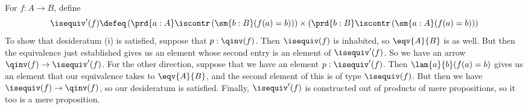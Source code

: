 For $f : A \to B$, define 
\[
  \isequiv'(f) \defeq
  \left(\prd{a:A}\iscontr\left(\sm{b:B}(f(a) = b)\right)\right)
  \times
  \left(\prd{b:B}\iscontr\left(\sm{a:A}(f(a) = b)\right)\right)
\]
To show that desideratum (i) is satisfied, suppose that $p : \qinv(f)$.  Then
$\isequiv(f)$ is inhabited, so $\eqv{A}{B}$ is as well.  But then the
equivalence just established gives us an element whose second entry is an
element of $\isequiv'(f)$.  So we have an arrow $\qinv(f) \to \isequiv'(f)$.
For the other direction, suppose that we have an element $p : \isequiv'(f)$.
Then $\lam{a}{b}(f(a) = b)$ gives us an element that our equivalence takes to
$\eqv{A}{B}$, and the second element of this is of type $\isequiv(f)$.  But
then we have $\isequiv(f) \to \qinv(f)$, so our desideratum is satisfied.
Finally, $\isequiv'(f)$ is constructed out of products of mere propositions, so
it too is a mere proposition.

